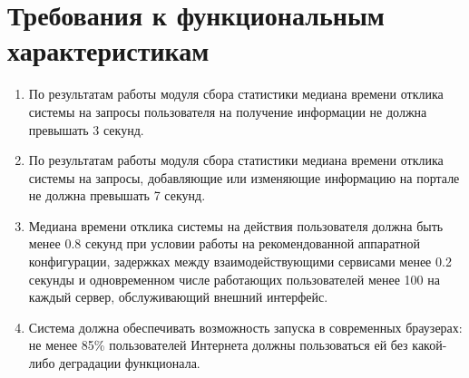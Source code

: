 \section*{Требования к функциональным характеристикам}
\begin{enumerate}
	\item По результатам работы модуля сбора статистики медиана времени отклика системы на запросы пользователя на получение информации не должна превышать 3 секунд.
	
	\item По результатам работы модуля сбора статистики медиана времени отклика системы на запросы, добавляющие или изменяющие информацию на портале не должна превышать 7 секунд.
	
	\item Медиана времени отклика системы на действия пользователя должна быть менее 0.8 секунд при условии работы на рекомендованной аппаратной конфигурации, задержках между взаимодействующими сервисами менее 0.2 секунды и одновременном числе работающих пользователей менее 100 на каждый сервер, обслуживающий внешний интерфейс.
	
	\item Система должна обеспечивать возможность запуска в современных браузерах: не менее 85\% пользователей Интернета должны пользоваться ей без какой-либо деградации функционала.
\end{enumerate}


